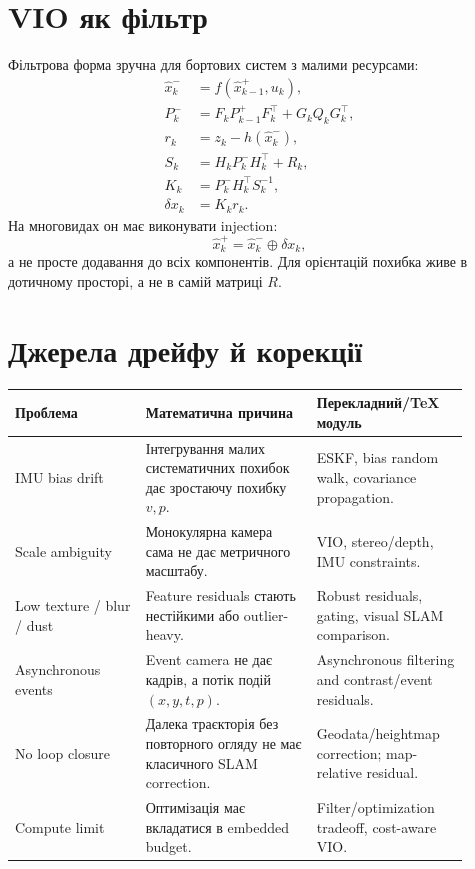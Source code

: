 \section*{VIO як фільтр}

Фільтрова форма зручна для бортових систем з малими ресурсами:
\[
\begin{aligned}
  \hat x^-_k &= f(\hat x^+_{k-1},u_k),\\
  P^-_k &= F_kP^+_{k-1}F_k^\top + G_kQ_kG_k^\top,\\
  r_k &= z_k-h(\hat x^-_k),\\
  S_k &= H_kP^-_kH_k^\top + R_k,\\
  K_k &= P^-_kH_k^\top S_k^{-1},\\
  \delta x_k &= K_kr_k.
\end{aligned}
\]
На многовидах он має виконувати injection:
\[
  \hat x^+_k = \hat x^-_k \oplus \delta x_k,
\]
а не просте додавання до всіх компонентів. Для орієнтацій похибка живе в дотичному просторі, а не в самій матриці $R$.

\section*{Джерела дрейфу й корекції}

\begin{longtable}{L{0.26\linewidth}L{0.34\linewidth}L{0.30\linewidth}}
\toprule
Проблема & Математична причина & Перекладний/TeX модуль \\
\midrule
IMU bias drift & Інтегрування малих систематичних похибок дає зростаючу похибку $v,p$. & ESKF, bias random walk, covariance propagation. \\
Scale ambiguity & Монокулярна камера сама не дає метричного масштабу. & VIO, stereo/depth, IMU constraints. \\
Low texture / blur / dust & Feature residuals стають нестійкими або outlier-heavy. & Robust residuals, gating, visual SLAM comparison. \\
Asynchronous events & Event camera не дає кадрів, а потік подій $(x,y,t,p)$. & Asynchronous filtering and contrast/event residuals. \\
No loop closure & Далека траєкторія без повторного огляду не має класичного SLAM correction. & Geodata/heightmap correction; map-relative residual. \\
Compute limit & Оптимізація має вкладатися в embedded budget. & Filter/optimization tradeoff, cost-aware VIO. \\
\bottomrule
\end{longtable}

